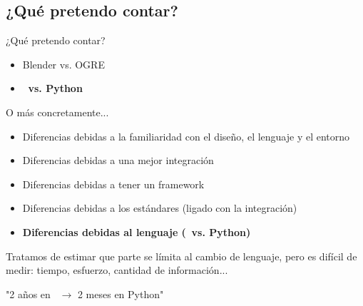 \subsection{¿Qué pretendo contar?}
\begin{frame}{¿Qué pretendo contar?}
	\begin{itemize}
		\item Blender vs. OGRE
		\item \textbf{\CC $\,$ vs. Python}
	\end{itemize}
	\pause
	O más concretamente...
	\begin{itemize}
		\item Diferencias debidas a la familiaridad con el diseño,
		el lenguaje y el entorno
		\item Diferencias debidas a una mejor integración
		\item Diferencias debidas a tener un framework
		\item Diferencias debidas a los estándares (ligado con la integración)
		\item \textbf{Diferencias debidas al lenguaje (\CC $\,$ vs. Python)}
	\end{itemize}

	\vspace{0.3cm}

	\begin{center}
		Tratamos de estimar que parte se límita al cambio de lenguaje,
		pero es difícil de medir: tiempo, esfuerzo, cantidad de información...
		
		"2 años en \CC $\,$ $\rightarrow$ 2 meses en Python"
	\end{center}
\end{frame}

